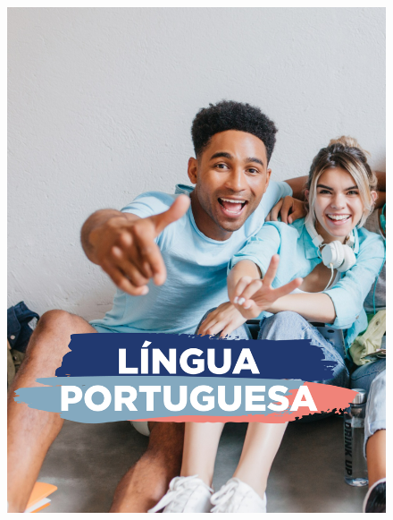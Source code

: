 \begin{figure}[htpb]
\vspace*{-2.5cm}
\hspace*{-2.5cm}\includegraphics[height=\paperheight]{../separadores/separadorPOR9A.png}
\end{figure}
\pagebreak

